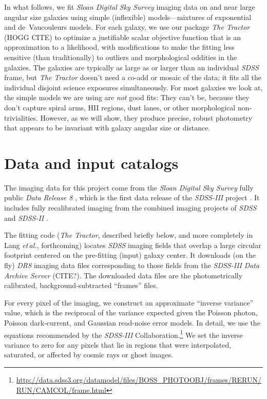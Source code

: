 \documentclass[12pt,preprint,pdftex]{aastex}
\newcommand{\foreign}[1]{\emph{#1}}
\newcommand{\etal}{\foreign{et\,al.}}
\newcommand{\project}[1]{\textsl{#1}}
\begin{document}
In what follows, we fit \project{Sloan Digital Sky Survey} imaging
data on and near large angular size galaxies using simple (inflexible)
models---mixtures of exponential and de~Vaucouleurs models.  For each
galaxy, we use our package \project{The Tractor} (HOGG CITE) to
optimize a justifiable scalar objective function that is an
approximation to a likelihood, with modifications to make the fitting
less sensitive (than traditionally) to outliers and morphological
oddities in the galaxies.  The galaxies are typically as large as or
larger than an individual \project{SDSS} frame, but \project{The
  Tractor} doesn't need a co-add or mosaic of the data; it fits all
the individual disjoint science exposures simultaneously.  For most
galaxies we look at, the simple models we are using are \emph{not}
good fits: They can't be, because they don't capture spiral arms, HII
regions, dust lanes, or other morphological non-trivialities.
However, as we will show, they produce precise, robust photometry that
appears to be invariant with galaxy angular size or distance.

\section{Data and input catalogs}\label{sec:data}

The imaging data for this project come from the \project{Sloan Digital
  Sky Survey} fully public \project{Data Release 8} \citep{dr8}, which is
the first data release of the \project{SDSS-III} project \citep{sdssiii}.  It
includes fully recalibrated imaging \citep{padmanabhan} from the
combined imaging projects of \project{SDSS} \citep{york}  and
\project{SDSS-II} \citep{sdssii}.

The fitting code (\project{The Tractor}, described briefly below, and
more completely in Lang \etal, forthcoming) locates \project{SDSS}
imaging fields that overlap a large circular footprint centered on the
pre-fitting (input) galaxy center.  It downloads (on the fly)
\project{DR8} imaging data files corresponding to those fields from
the \project{SDSS-III} \project{Data Archive Server} (CITE?).  The
downloaded data files are the photometrically calibrated,
background-subtracted ``frames'' files.

For every pixel of the imaging, we construct an approximate ``inverse
variance'' value, which is the reciprocal of the variance expected
given the Poisson photon, Poisson dark-current, and Gaussian
read-noise error models.  In detail, we use the equations recommended
by the \project{SDSS-III}
Collaboration.\footnote{\url{http://data.sdss3.org/datamodel/files/BOSS\_PHOTOOBJ/frames/RERUN/RUN/CAMCOL/frame.html}}
We set the inverse variance to zero for any pixels that lie in regions
that were interpolated, saturated, or affected by cosmic rays or ghost
images.
\end{document}
